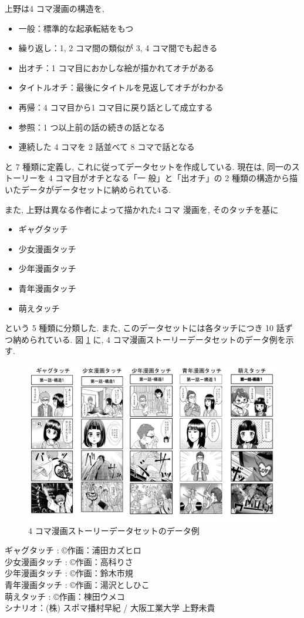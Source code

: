 上野は4 コマ漫画の構造を,

\begin{itemize}
  \item 一般：標準的な起承転結をもつ
  \item 繰り返し：1, 2 コマ間の類似が 3, 4 コマ間でも起きる
  \item 出オチ：1 コマ目におかしな絵が描かれてオチがある
  \item タイトルオチ：最後にタイトルを見返してオチがわかる
  \item 再帰：4 コマ目から1 コマ目に戻り話として成立する
  \item 参照：1 つ以上前の話の続きの話となる
  \item 連続した 4 コマを 2 話並べて 8 コマで話となる
\end{itemize}

と 7 種類に定義し, これに従ってデータセットを作成している.
現在は, 同一のストーリーを 4 コマ目がオチとなる「一
般」と「出オチ」の 2 種類の構造から描いたデータがデータセットに納められている.

また, 上野は異なる作者によって描かれた4 コマ
漫画を, そのタッチを基に

\begin{itemize}
  \item ギャグタッチ
  \item 少女漫画タッチ
  \item 少年漫画タッチ
  \item 青年漫画タッチ
  \item 萌えタッチ
\end{itemize}

という 5 種類に分類した. また, このデータセットには各タッチにつき 10 話ずつ納められている. 図 \ref{fig:4koma_data} に,
4 コマ漫画ストーリーデータセットのデータ例を示す.

\newpage
\begin{figure}[!h]
  \centering
  \includegraphics[width=0.8\hsize]{doc/figures/4koma_data.png}
  \caption{4 コマ漫画ストーリーデータセットのデータ例}
  \label{fig:4koma_data}
\end{figure}

\begin{flushleft}
\begin{center}
ギャグタッチ : \copyright 作画：浦田カズヒロ \\
少女漫画タッチ : \copyright 作画：高科りさ \\
少年漫画タッチ : \copyright 作画：鈴木市規 \\
青年漫画タッチ : \copyright 作画：湯沢としひこ \\
萌えタッチ : \copyright 作画：棟田ウメコ \\
シナリオ：(株) スポマ播村早紀 / 大阪工業大学 上野未貴 \\
\end{center}
\end{flushleft}
